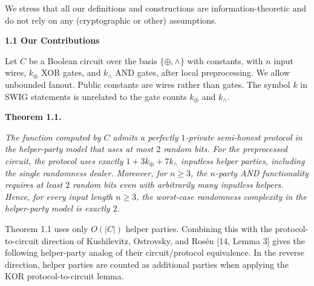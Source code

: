 We stress that all our definitions and constructions are information-theoretic and do not rely on any (cryptographic or other) assumptions.\par




\par\medskip\noindent\textbf{
1.1 Our Contributions}\par




Let $C$ be a Boolean circuit over the basis $\{\oplus,\wedge\}$ with constants, with $n$ input wires, $k_{\oplus}$ XOR gates, and $k_{\wedge}$ AND gates, after local preprocessing. We allow unbounded fanout. Public constants are wires rather than gates. The symbol $k$ in SWIG statements is unrelated to the gate counts $k_{\oplus}$ and $k_{\wedge}$.\par





\par\medskip\noindent\textbf{
\textbf{Theorem 1.1}\textbf{.}
}\par



\emph{The function computed by $C$ admits a perfectly $1$-private semi-honest protocol in the helper-party model that uses at most $2$ random bits. For the preprocessed circuit, the protocol uses exactly $1+3k_{\oplus}+7k_{\wedge}$ inputless helper parties, including the single randomness dealer.
Moreover, for $n\geq 3$, the $n$-party AND functionality requires at least $2$ random bits even with arbitrarily many inputless helpers. Hence, for every input length $n\geq 3$, the worst-case randomness complexity in the helper-party model is exactly $2$.}\par






Theorem 1.1 uses only $O(|C|)$ helper parties. Combining this with the protocol-to-circuit direction of Kushilevitz, Ostrovsky, and Rosén [14, Lemma 3] gives the following helper-party analog of their circuit/protocol equivalence. In the reverse direction, helper parties are counted as additional parties when applying the KOR protocol-to-circuit lemma.\par





